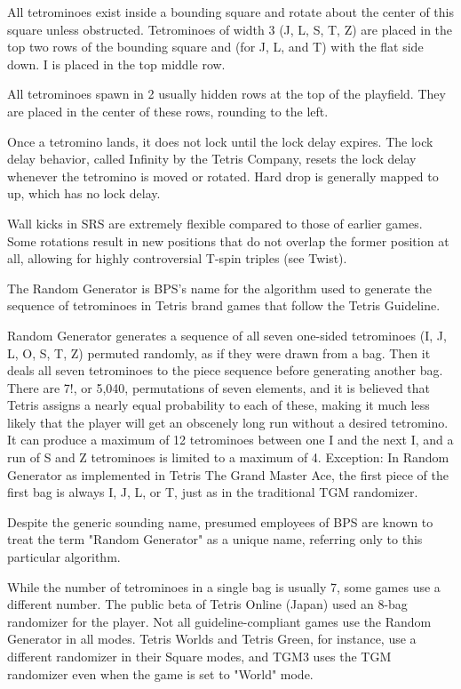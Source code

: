 \documentclass[
	12pt,				%
	openright,			%
	oneside,			%
	a4paper,			%
	brazil,				%
	]{abntex2}
\begin{document}
All tetrominoes exist inside a bounding square and rotate about the center of this square unless obstructed. Tetrominoes of width 3 (J, L, S, T, Z) are placed in the top two rows of the bounding square and (for J, L, and T) with the flat side down. I is placed in the top middle row.

All tetrominoes spawn in 2 usually hidden rows at the top of the playfield. They are placed in the center of these rows, rounding to the left.

Once a tetromino lands, it does not lock until the lock delay expires. The lock delay behavior, called Infinity by the Tetris Company, resets the lock delay whenever the tetromino is moved or rotated. Hard drop is generally mapped to up, which has no lock delay.

Wall kicks in SRS are extremely flexible compared to those of earlier games. Some rotations result in new positions that do not overlap the former position at all, allowing for highly controversial T-spin triples (see Twist).

The Random Generator is BPS's name for the algorithm used to generate the sequence of tetrominoes in Tetris brand games that follow the Tetris Guideline.

Random Generator generates a sequence of all seven one-sided tetrominoes (I, J, L, O, S, T, Z) permuted randomly, as if they were drawn from a bag. Then it deals all seven tetrominoes to the piece sequence before generating another bag. There are 7!, or 5,040, permutations of seven elements, and it is believed that Tetris assigns a nearly equal probability to each of these, making it much less likely that the player will get an obscenely long run without a desired tetromino. It can produce a maximum of 12 tetrominoes between one I and the next I, and a run of S and Z tetrominoes is limited to a maximum of 4. Exception: In Random Generator as implemented in Tetris The Grand Master Ace, the first piece of the first bag is always I, J, L, or T, just as in the traditional TGM randomizer.

Despite the generic sounding name, presumed employees of BPS are known to treat the term "Random Generator" as a unique name, referring only to this particular algorithm.

While the number of tetrominoes in a single bag is usually 7, some games use a different number. The public beta of Tetris Online (Japan) used an 8-bag randomizer for the player. Not all guideline-compliant games use the Random Generator in all modes. Tetris Worlds and Tetris Green, for instance, use a different randomizer in their Square modes, and TGM3 uses the TGM randomizer even when the game is set to "World" mode.
\end{document}
